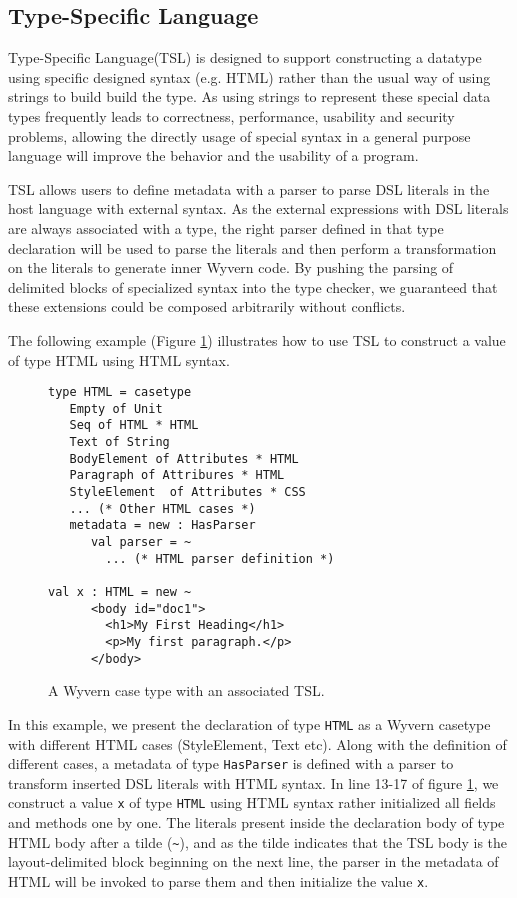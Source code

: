 \documentclass{sig-alternate}
\begin{document}
\subsection{Type-Specific Language}
Type-Specific Language(TSL) is designed to support constructing a datatype using specific designed syntax (e.g. HTML) rather than the usual way of using strings to build build the type. As using strings to represent these special data types frequently leads to correctness, performance, usability and security problems, allowing the directly usage of special syntax in a general purpose language will improve the behavior and the usability of a program.
\par
TSL allows users to define metadata with a parser to parse DSL literals in the host language with external syntax. As the external expressions with DSL literals are always associated with a type, the right parser defined in that type declaration will be used to parse the literals and then perform a transformation on the literals to generate inner Wyvern code. By pushing the parsing of delimited blocks of specialized syntax into the type checker, we guaranteed that these extensions could be composed arbitrarily without conflicts.
\par
The following example (Figure \ref{f-htmltype}) illustrates how to use TSL to construct a value of type HTML using HTML syntax.
\begin{figure}[ht!]
\begin{lstlisting}[style=wyvern]
type HTML = casetype 
   Empty of Unit
   Seq of HTML * HTML 
   Text of String
   BodyElement of Attributes * HTML
   Paragraph of Attribures * HTML
   StyleElement  of Attributes * CSS
   ... (* Other HTML cases *)
   metadata = new : HasParser
      val parser = ~
        ... (* HTML parser definition *)

val x : HTML = new ~
      <body id="doc1">
        <h1>My First Heading</h1>
        <p>My first paragraph.</p>
      </body>
\end{lstlisting}
\vspace{-8px}
\caption{A Wyvern case type with an associated TSL.}
\vspace{-10px}
\label{f-htmltype}
\end{figure}

In this example, we present the declaration of type \verb|HTML| as a Wyvern casetype with different HTML cases (StyleElement, Text etc). Along with the definition of different cases, a metadata of type \verb|HasParser| is defined with a parser to transform inserted DSL literals with HTML syntax. In line 13-17 of figure \ref{f-htmltype}, we construct a value \verb|x| of type \verb|HTML| using HTML syntax rather initialized all fields and methods one by one. The literals present inside the declaration body of type HTML body after a tilde (\verb|~|), and as the tilde indicates that the TSL body is the layout-delimited block beginning on the next line, the parser in the metadata of HTML will be invoked to parse them and then initialize the value \verb|x|.
\end{document}
